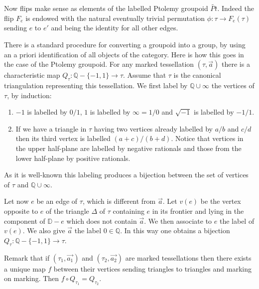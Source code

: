 \documentclass[twoside]{irmaems}
\theoremstyle{plain}
\theoremstyle{definition}
\theoremstyle{remark}
\begin{document}
\vspace{0.2cm}
\noindent 
Now flips make sense as elements of the labelled Ptolemy groupoid 
$\widetilde{Pt}$. Indeed the flip $F_e$ is endowed with 
the natural eventually trivial permutation  $\phi:\tau\to F_e(\tau)$ 
sending $e$ to $e'$ and being the identity for all other edges. 


\vspace{0.2cm}
\noindent 
There is a standard procedure for converting a groupoid into a group, by 
using an a priori identification of all objects of the category. 
Here is how this goes  in the case of the Ptolemy groupoid. 
For any marked tessellation $(\tau, \vec{a})$ there is a 
characteristic map $Q_{\tau}:{\mathbb Q}-\{-1,1\}\to \tau$. 
Assume that $\tau$ is the canonical triangulation representing this 
tessellation. 
We first label by $\mathbb Q\cup{\infty}$ 
the vertices of $\tau$, by induction:
\begin{enumerate}
\item $-1$ is labelled by $0/1$, $1$ is labelled by $\infty=1/0$ and 
$\sqrt{-1}$ is labelled by $-1/1$. 
\item If we have a triangle in $\tau$ having two vertices already 
labelled by $a/b$ and $c/d$  then its third vertex is labelled $(a+c)/(b+d)$. 
Notice that vertices in the upper half-plane are labelled by negative 
rationals and those from the lower half-plane by positive rationals. 
\end{enumerate}
\vspace{0.2cm}
\noindent 
As it is well-known this labeling produces a bijection between 
the set of vertices of $\tau$ and $\mathbb Q\cup{\infty}$. 

\vspace{0.2cm}
\noindent 
Let now  $e$ be an edge of $\tau$, which is different from $\vec{a}$.
Let $v(e)$ be the vertex  opposite to $e$ of the triangle $\Delta$ of $\tau$ 
containing $e$ in its frontier and lying in the component of 
${\mathbb D}-e$ which does not contain 
$\vec{a}$. We then associate to $e$ the label of $v(e)$. 
We also give  $\vec{a}$ the label $0\in {\mathbb Q}$.  
In this way one obtains a bijection  
$Q_{\tau}:{\mathbb Q}-\{-1,1\}\to \tau$. 

\vspace{0.2cm}
\noindent 
Remark that if $(\tau_1,\vec{a_1})$ and $(\tau_2,\vec{a_2})$ are 
marked tessellations then there exists a unique map $f$ between their vertices 
sending triangles to triangles and marking on  marking. 
Then $f\circ Q_{\tau_1}=Q_{\tau_2}$. 
\end{document}
